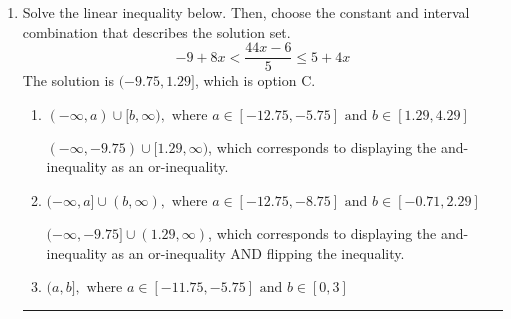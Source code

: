 \documentclass{extbook}[14pt]
\newcommand{\litem}[1]{\item #1

\rule{\textwidth}{0.4pt}}
\begin{document}
\begin{enumerate}
{\begin{enumerate}[label=\Alph*.]
 $(-\infty, -0.722]$, which corresponds to switching the direction of the interval. You likely did this if you did not flip the inequality when dividing by a negative!
\item \( (-\infty, a], \text{ where } a \in [0.02, 1.01] \)

 $(-\infty, 0.722]$, which corresponds to switching the direction of the interval AND negating the endpoint. You likely did this if you did not flip the inequality when dividing by a negative as well as not moving values over to a side properly.
\item \( [a, \infty), \text{ where } a \in [-1.14, 0.02] \)

* $[-0.722, \infty)$, which is the correct option.
\item \( [a, \infty), \text{ where } a \in [0.57, 2.51] \)

 $[0.722, \infty)$, which corresponds to negating the endpoint of the solution.
\item \( \text{None of the above}. \)

You may have chosen this if you thought the inequality did not match the ends of the intervals.
\end{enumerate}

\textbf{General Comment:} Remember that less/greater than or equal to includes the endpoint, while less/greater do not. Also, remember that you need to flip the inequality when you multiply or divide by a negative.
}
\litem{
Solve the linear inequality below. Then, choose the constant and interval combination that describes the solution set.
\[ -9 + 8 x < \frac{44 x - 6}{5} \leq 5 + 4 x \]The solution is \( (-9.75, 1.29] \), which is option C.\begin{enumerate}[label=\Alph*.]
\item \( (-\infty, a) \cup [b, \infty), \text{ where } a \in [-12.75, -5.75] \text{ and } b \in [1.29, 4.29] \)

$(-\infty, -9.75) \cup [1.29, \infty)$, which corresponds to displaying the and-inequality as an or-inequality.
\item \( (-\infty, a] \cup (b, \infty), \text{ where } a \in [-12.75, -8.75] \text{ and } b \in [-0.71, 2.29] \)

$(-\infty, -9.75] \cup (1.29, \infty)$, which corresponds to displaying the and-inequality as an or-inequality AND flipping the inequality.
\item \( (a, b], \text{ where } a \in [-11.75, -5.75] \text{ and } b \in [0, 3] \)


\end{enumerate}}
\end{enumerate}
\end{document}
